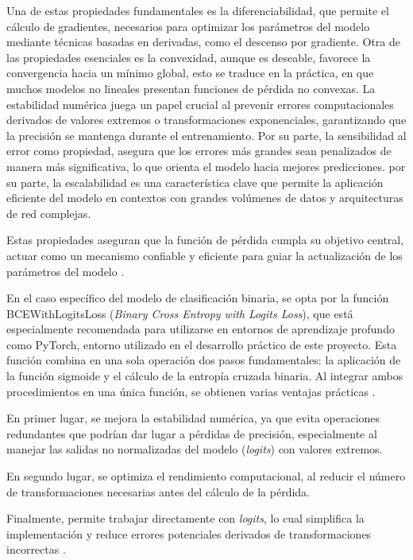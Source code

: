 Una de estas propiedades fundamentales es la diferenciabilidad, que permite el cálculo de gradientes, necesarios para optimizar los parámetros del modelo mediante técnicas basadas en derivadas, como el descenso por gradiente. Otra de las propiedades esenciales es la convexidad, aunque es deseable, favorece la convergencia hacia un mínimo global, esto se traduce en la práctica, en que muchos modelos no lineales presentan funciones de pérdida no convexas. La estabilidad numérica juega un papel crucial al prevenir errores computacionales derivados de valores extremos o transformaciones exponenciales, garantizando que la precisión se mantenga durante el entrenamiento. Por su parte, la sensibilidad al error como propiedad, asegura que los errores más grandes sean penalizados de manera más significativa, lo que orienta el modelo hacia mejores predicciones. por su parte, la escalabilidad es una característica clave que permite la aplicación eficiente del modelo en contextos con grandes volúmenes de datos y arquitecturas de red complejas.

Estas propiedades aseguran que la función de pérdida cumpla su objetivo central, actuar como un mecanismo confiable y eficiente para guiar la actualización de los parámetros del modelo \cite{ultralytics_loss_function}.

En el caso específico del modelo de clasificación binaria, se opta por la función BCEWithLogitsLoss (\textit{Binary Cross Entropy with Logits Loss}), que está especialmente recomendada para utilizarse en entornos de aprendizaje profundo como PyTorch, entorno utilizado en el desarrollo práctico de este proyecto. Esta función combina en una sola operación dos pasos fundamentales: la aplicación de la función sigmoide y el cálculo de la entropía cruzada binaria. Al integrar ambos procedimientos en una única función, se obtienen varias ventajas prácticas \cite{datacamp_loss_function}.

En primer lugar, se mejora la estabilidad numérica, ya que evita operaciones redundantes que podrían dar lugar a pérdidas de precisión, especialmente al manejar las salidas no normalizadas del modelo (\textit{logits}) con valores extremos.

En segundo lugar, se optimiza el rendimiento computacional, al reducir el número de transformaciones necesarias antes del cálculo de la pérdida. 

Finalmente, permite trabajar directamente con \textit{logits}, lo cual simplifica la implementación y reduce errores potenciales derivados de transformaciones incorrectas \cite{bigdatafran_pytorch_classification}.




